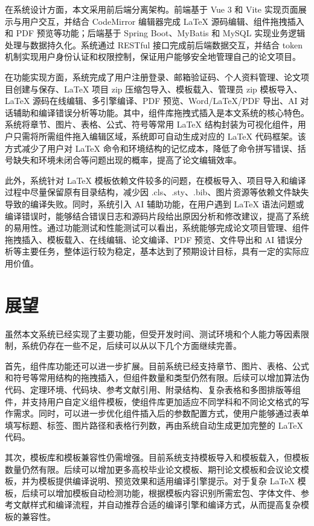 \documentclass{xduugthesis}
\begin{document}
在系统设计方面，本文采用前后端分离架构。前端基于 Vue 3 和 Vite 实现页面展示与用户交互，并结合 CodeMirror 编辑器完成 LaTeX 源码编辑、组件拖拽插入和 PDF 预览等功能；后端基于 Spring Boot、MyBatis 和 MySQL 实现业务逻辑处理与数据持久化。系统通过 RESTful 接口完成前后端数据交互，并结合 token 机制实现用户身份认证和权限控制，保证用户能够安全地管理自己的论文项目。

在功能实现方面，系统完成了用户注册登录、邮箱验证码、个人资料管理、论文项目创建与保存、LaTeX 项目 zip 压缩包导入、模板载入、管理员 zip 模板导入、LaTeX 源码在线编辑、多引擎编译、PDF 预览、Word/LaTeX/PDF 导出、AI 对话辅助和编译错误分析等功能。其中，组件库拖拽式插入是本文系统的核心特色。系统将章节、图片、表格、公式、符号等常用 LaTeX 结构封装为可视化组件，用户只需将所需组件拖入编辑区域，系统即可自动生成对应的 LaTeX 代码框架。该方式减少了用户对 LaTeX 命令和环境结构的记忆成本，降低了命令拼写错误、括号缺失和环境未闭合等问题出现的概率，提高了论文编辑效率。

此外，系统针对 LaTeX 模板依赖文件较多的问题，在模板导入、项目导入和编译过程中尽量保留原有目录结构，减少因 .cls、.sty、.bib、图片资源等依赖文件缺失导致的编译失败。同时，系统引入 AI 辅助功能，在用户遇到 LaTeX 语法问题或编译错误时，能够结合错误日志和源码片段给出原因分析和修改建议，提高了系统的易用性。通过功能测试和性能测试可以看出，系统能够完成论文项目管理、组件拖拽插入、模板载入、在线编辑、论文编译、PDF 预览、文件导出和 AI 错误分析等主要任务，整体运行较为稳定，基本达到了预期设计目标，具有一定的实际应用价值。

\section{展望}
虽然本文系统已经实现了主要功能，但受开发时间、测试环境和个人能力等因素限制，系统仍存在一些不足，后续可以从以下几个方面继续完善。

首先，组件库功能还可以进一步扩展。目前系统已经支持章节、图片、表格、公式和符号等常用结构的拖拽插入，但组件数量和类型仍然有限。后续可以增加算法伪代码、定理环境、代码块、参考文献引用、附录结构、复杂表格和多图排版等组件，并支持用户自定义组件模板，使组件库更加适应不同学科和不同论文格式的写作需求。同时，可以进一步优化组件插入后的参数配置方式，使用户能够通过表单填写标题、标签、图片路径和表格行列数，再由系统自动生成更加完整的 LaTeX 代码。

其次，模板库和模板兼容性仍需增强。目前系统支持模板导入和模板载入，但模板数量仍然有限。后续可以增加更多高校毕业论文模板、期刊论文模板和会议论文模板，并为模板提供编译说明、预览效果和适用编译引擎提示。对于复杂 LaTeX 模板，后续可以增加模板自动检测功能，根据模板内容识别所需宏包、字体文件、参考文献样式和编译流程，并自动推荐合适的编译引擎和编译方式，从而提高复杂模板的兼容性。
\end{document}

